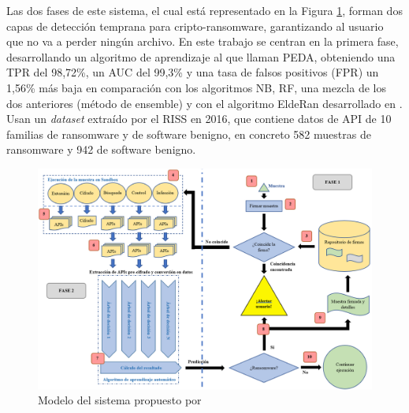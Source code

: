 Las dos fases de este sistema, el cual está representado en la Figura \ref{fig:peda}, forman dos capas de detección temprana para cripto-ransomware, garantizando al usuario que no va a perder ningún archivo. En este trabajo se centran en la primera fase, desarrollando un algoritmo de aprendizaje al que llaman PEDA, obteniendo una \gls{TPR} del 98,72\%, un \gls{AUC} del 99,3\% y una tasa de falsos positivos (\gls{FPR}) un 1,56\% más baja en comparación con los algoritmos \gls{NB}, \gls{RF}, una mezcla de los dos anteriores (método de ensemble) y con el algoritmo EldeRan desarrollado en \cite{elderan}. Usan un \textit{dataset} extraído por el \gls{RISS} en 2016, que contiene datos de \gls{API} de 10 familias de ransomware y de software benigno, en concreto 582 muestras de ransomware y 942 de software benigno.


\begin{figure}[h!]
\begin{center}
\includegraphics[width=1\linewidth]{images/peda.PNG}
\end{center}
\caption{Modelo del sistema propuesto por \cite{Kok2019}}
\label{fig:peda}
\end{figure}

\newpage

